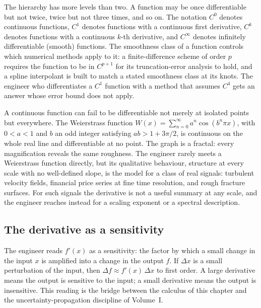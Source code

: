 The hierarchy has more levels than two. A function may be once
differentiable but not twice, twice but not three times, and so on.
The notation $C^{0}$ denotes continuous functions, $C^{1}$ denotes
functions with a continuous first derivative, $C^{k}$ denotes
functions with a continuous $k$-th derivative, and $C^{\infty}$
denotes infinitely differentiable (smooth) functions. The
smoothness class of a function controls which numerical methods
apply to it: a finite-difference scheme of order $p$ requires the
function to be in $C^{p+1}$ for its truncation-error analysis to
hold, and a spline interpolant is built to match a stated
smoothness class at its knots. The engineer who differentiates a
$C^{1}$ function with a method that assumes $C^{4}$ gets an answer
whose error bound does not apply.

\begin{remark}
A continuous function can fail to be differentiable not merely at
isolated points but everywhere. The Weierstrass function
$W(x) = \sum_{n=0}^{\infty} a^{n} \cos(b^{n} \pi x)$, with
$0 < a < 1$ and $b$ an odd integer satisfying $a b > 1 + 3\pi/2$,
is continuous on the whole real line and differentiable at no
point. The graph is a fractal: every magnification reveals the
same roughness. The engineer rarely meets a Weierstrass function
directly, but its qualitative behaviour, structure at every scale
with no well-defined slope, is the model for a class of real
signals: turbulent velocity fields, financial price series at fine
time resolution, and rough fracture surfaces. For such signals the
derivative is not a useful summary at any scale, and the engineer
reaches instead for a scaling exponent or a spectral description.
\end{remark}

\subsection{The derivative as a sensitivity}

The engineer reads $f'(x)$ as a sensitivity: the factor by which a
small change in the input $x$ is amplified into a change in the
output $f$. If $\Delta x$ is a small perturbation of the input,
then $\Delta f \approx f'(x) \, \Delta x$ to first order. A large
derivative means the output is sensitive to the input; a small
derivative means the output is insensitive. This reading is the
bridge between the calculus of this chapter and the
uncertainty-propagation discipline of Volume~I.

